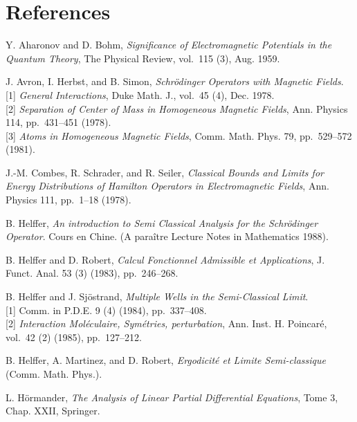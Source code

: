 \documentclass[11pt]{article}
\begin{document}
\section*{References}
\begin{description}[leftmargin=3.2cm,style=nextline]
\item[{[AH--BO]}] Y. Aharonov and D. Bohm, \emph{Significance of Electromagnetic Potentials in the Quantum Theory}, The Physical Review, vol.~115 (3), Aug. 1959.

\item[{[A--H--S]}] J. Avron, I. Herbst, and B. Simon, \emph{Schrödinger Operators with Magnetic Fields}.\\
{}[1] \emph{General Interactions}, Duke Math. J., vol.~45 (4), Dec. 1978.\\
{}[2] \emph{Separation of Center of Mass in Homogeneous Magnetic Fields}, Ann. Physics 114, pp.~431--451 (1978).\\
{}[3] \emph{Atoms in Homogeneous Magnetic Fields}, Comm. Math. Phys. 79, pp.~529--572 (1981).

\item[{[C--S--S]}] J.-M. Combes, R. Schrader, and R. Seiler, \emph{Classical Bounds and Limits for Energy Distributions of Hamilton Operators in Electromagnetic Fields}, Ann. Physics 111, pp.~1--18 (1978).

\item[{[HE]}] B. Helffer, \emph{An introduction to Semi Classical Analysis for the Schrödinger Operator}. Cours en Chine. (A paraître Lecture Notes in Mathematics 1988).

\item[{[HE--RO]}] B. Helffer and D. Robert, \emph{Calcul Fonctionnel Admissible et Applications}, J. Funct. Anal. 53 (3) (1983), pp.~246--268.

\item[{[HE--SJ]}] B. Helffer and J. Sjöstrand, \emph{Multiple Wells in the Semi-Classical Limit}.\\
{}[1] Comm. in P.D.E. 9 (4) (1984), pp.~337--408.\\
{}[2] \emph{Interaction Moléculaire, Symétries, perturbation}, Ann. Inst. H. Poincaré, vol.~42 (2) (1985), pp.~127--212.

\item[{[HE--MA--RO]}] B. Helffer, A. Martinez, and D. Robert, \emph{Ergodicité et Limite Semi-classique} (Comm. Math. Phys.).

\item[{[HO]}] L. Hörmander, \emph{The Analysis of Linear Partial Differential Equations}, Tome 3, Chap. XXII, Springer.


\end{description}
\end{document}
